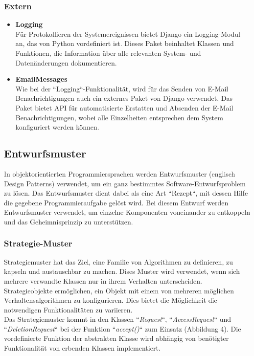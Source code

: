 \documentclass[parskip=full,11pt]{scrartcl}
\begin{document}
 \subsubsection*{Extern}
 \begin{itemize}
 \item{\textbf{Logging}}\\
Für Protokollieren der Systemereignissen bietet Django ein Logging-Modul an, das von Python vordefiniert ist. Dieses Paket beinhaltet Klassen und Funktionen, die Information über alle relevanten System- und Datenänderungen dokumentieren. 
 \item{\textbf{EmailMessages}}\\
Wie bei der ``Logging``-Funktionalität, wird für das Senden von E-Mail Benachrichtigungen auch ein externes Paket von Django verwendet. Das Paket bietet API für automatisierte Erstatten und Absenden der E-Mail Benachrichtigungen, wobei alle Einzelheiten entsprechen dem System konfiguriert werden können.
 \end{itemize}
 
\newpage
 \subsection{Entwurfsmuster}
In objektorientierten Programmiersprachen werden Entwurfsmuster (englisch Design Patterns) verwendet, um ein ganz bestimmtes Software-Entwurfsproblem zu lösen. Das Entwurfsmuster dient dabei als eine Art ``Rezept``, mit dessen Hilfe die gegebene Programmieraufgabe gelöst wird. 
Bei diesem Entwurf werden Entwurfsmuster verwendet, um einzelne Komponenten voneinander zu entkoppeln und das \gls{Geheimnisprinzip} zu unterstützen. 

 \subsubsection*{Strategie-Muster}
 
Strategiemuster hat das Ziel, eine Familie von Algorithmen zu definieren, zu kapseln und austauschbar zu machen. Dises Muster wird verwendet, wenn sich mehrere verwandte Klassen nur in ihrem Verhalten unterscheiden. Strategieobjekte ermöglichen, ein Objekt mit einem von mehreren möglichen Verhaltensalgorithmen zu konfigurieren. Dies bietet die Möglichkeit die notwendigen Funktionalitäten zu variieren.\\
Das Strategiemuster kommt in den Klassen ``\textit{Request}``, ``\textit{AccessRequest}`` und ``\textit{DeletionRequest}`` bei der Funktion ``\textit{accept()}`` zum Einsatz (Abbildung 4). Die vordefinierte Funktion der abstrakten Klasse wird abhängig von benötigter Funktionalität von erbenden Klassen  implementiert. \\\\ 
  
\end{document}
